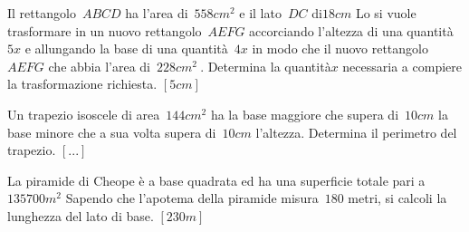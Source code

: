 \begin{multicols}{2}
\begin{esercizio}[\Ast]
 \label{ese:3.145}
Il rettangolo~\(ABCD\) ha l'area di~\(558\unit{cm^2}\) e il lato~\(DC\) 
di\( 
18\unit{cm}\) Lo si
vuole trasformare in un nuovo rettangolo~\(AEFG\) accorciando l'altezza di 
una 
quantità~\(5x\) e allungando la base di una quantità~\(4x\) in modo che il 
nuovo 
rettangolo~\(AEFG\) che abbia l'area di~\(228\unit{cm^2}~\).
Determina la quantità\( x\) necessaria a compiere la trasformazione 
richiesta.
\hfill\(\left[5\unit{cm}\right]\)
\end{esercizio}
% 

\begin{esercizio}
 \label{ese:3.147}
Un trapezio isoscele di area~\(144\unit{cm^2}\) ha la base maggiore che 
supera 
di~\(10\unit{cm}\)
la base minore che a sua volta supera di~\(10\unit{cm}\) l'altezza. 
Determina 
il 
perimetro del trapezio.
\hfill\(\left[...\right]\)
\end{esercizio}
% 
%  

\begin{esercizio}[\Ast]
 \label{ese:3.149}
La piramide di Cheope è a base quadrata ed ha una superficie totale pari a
\( 135700\unit{m^2}\) Sapendo che l'apotema della piramide misura~\(180\) 
metri, 
si
calcoli la lunghezza del lato di base.
\hfill\(\left[230\unit{m}\right]\)
\end{esercizio}


\end{multicols}
